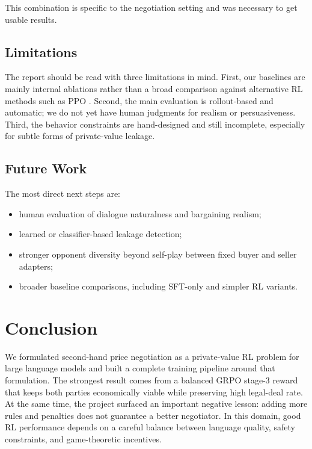 \documentclass[11pt]{article}
\begin{document}
This combination is specific to the negotiation setting and was necessary to get usable results.

\subsection{Limitations}

The report should be read with three limitations in mind. First, our baselines are mainly internal ablations rather than a broad comparison against alternative RL methods such as PPO \citep{schulman2017ppo}. Second, the main evaluation is rollout-based and automatic; we do not yet have human judgments for realism or persuasiveness. Third, the behavior constraints are hand-designed and still incomplete, especially for subtle forms of private-value leakage.

\subsection{Future Work}

The most direct next steps are:
\begin{itemize}
    \item human evaluation of dialogue naturalness and bargaining realism;
    \item learned or classifier-based leakage detection;
    \item stronger opponent diversity beyond self-play between fixed buyer and seller adapters;
    \item broader baseline comparisons, including SFT-only and simpler RL variants.
\end{itemize}

\section{Conclusion}

We formulated second-hand price negotiation as a private-value RL problem for large language models and built a complete training pipeline around that formulation. The strongest result comes from a balanced GRPO stage-3 reward that keeps both parties economically viable while preserving high legal-deal rate. At the same time, the project surfaced an important negative lesson: adding more rules and penalties does not guarantee a better negotiator. In this domain, good RL performance depends on a careful balance between language quality, safety constraints, and game-theoretic incentives.



\end{document}
